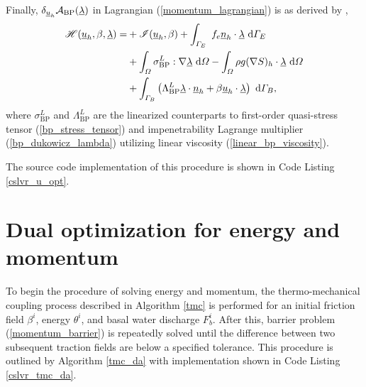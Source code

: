 Finally, $\delta_{\underline{u}_h} \mathcal{A}_{\text{BP}}(\underline{\lambda})$ in Lagrangian (\ref{momentum_lagrangian}) is as derived by \citet{dukowicz_2010},
\begin{align}
  \label{momentum_expanded_lagrangian}
  \mathscr{H}(\underline{u}_h, \beta, \underline{\lambda}) =
  &+ \mathscr{I}(\underline{u}_h, \beta) + \int_{\varGamma_E}\ f_e \underline{n}_h \cdot \underline{\lambda} \ \mathrm{d}\varGamma_E \notag \\
  &+ \int_{\varOmega} \sigma_{\text{BP}}^L : \nabla \underline{\lambda} \ \mathrm{d}\varOmega
   - \int_{\varOmega} \rho g (\nabla S)_h \cdot \underline{\lambda} \ \mathrm{d}\varOmega \notag \\
  &+ \int_{\varGamma_B} \left( \Lambda_{\text{BP}}^L \underline{\lambda} \cdot \underline{n}_h + \beta \underline{u}_h \cdot \underline{\lambda} \right) \ \mathrm{d}\varGamma_B,
\end{align}
where $\sigma_{\text{BP}}^L$ and $\Lambda_{\text{BP}}^L$ are the linearized counterparts to first-order quasi-stress tensor (\ref{bp_stress_tensor}) and impenetrability Lagrange multiplier (\ref{bp_dukowicz_lambda}) utilizing linear viscosity (\ref{linear_bp_viscosity}).

The \CSLVR source code implementation of this procedure is shown in Code Listing \ref{cslvr_u_opt}.


\section{Dual optimization for energy and momentum} \label{ssn_dual_optimization}

To begin the procedure of solving energy and momentum, the thermo-mechanical coupling process described in Algorithm \ref{tmc} is performed for an initial friction field $\beta^i$, energy $\theta^i$, and basal water discharge $F_b^i$.  After this, barrier problem (\ref{momentum_barrier}) is repeatedly solved until the difference between two subsequent traction fields are below a specified tolerance.  This procedure is outlined by Algorithm \ref{tmc_da} with \CSLVR implementation shown in Code Listing \ref{cslvr_tmc_da}.

